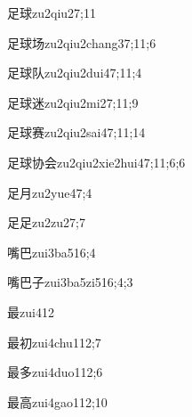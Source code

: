 \begin{verbete}{足球}{zu2qiu2}{7;11}
\end{verbete}
\begin{verbete}{足球场}{zu2qiu2chang3}{7;11;6}
\end{verbete}
\begin{verbete}{足球队}{zu2qiu2dui4}{7;11;4}
\end{verbete}
\begin{verbete}{足球迷}{zu2qiu2mi2}{7;11;9}
\end{verbete}
\begin{verbete}{足球赛}{zu2qiu2sai4}{7;11;14}
\end{verbete}
\begin{verbete}{足球协会}{zu2qiu2xie2hui4}{7;11;6;6}
\end{verbete}
\begin{verbete}{足月}{zu2yue4}{7;4}
\end{verbete}
\begin{verbete}{足足}{zu2zu2}{7;7}
\end{verbete}
\begin{verbete}{嘴巴}{zui3ba5}{16;4}
\end{verbete}
\begin{verbete}{嘴巴子}{zui3ba5zi5}{16;4;3}
\end{verbete}
\begin{verbete}{最}{zui4}{12}
\end{verbete}
\begin{verbete}{最初}{zui4chu1}{12;7}
\end{verbete}
\begin{verbete}{最多}{zui4duo1}{12;6}
\end{verbete}
\begin{verbete}{最高}{zui4gao1}{12;10}
\end{verbete}
